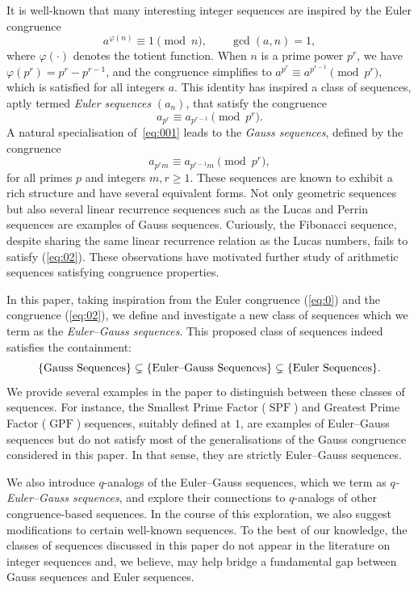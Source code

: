 \documentclass{article}
\numberwithin{equation}{section}
\theoremstyle{definition}
\begin{document}
It is well-known that many interesting integer sequences are inspired by the Euler congruence
\begin{equation}\label{eq:0}
a^{\varphi(n)} \equiv 1 \pmod{n}, \qquad \gcd(a,n)=1,
\end{equation}
where $\varphi(\cdot)$ denotes the totient function.  
When $n$ is a prime power $p^{r}$, we have $\varphi(p^{r}) = p^{r} - p^{r-1}$, and the congruence simplifies to
$
a^{p^{r}} \equiv a^{p^{r-1}} \pmod{p^{r}},
$
which is satisfied for all integers $a$.  
This identity has inspired a class of sequences, aptly termed \emph{Euler sequences} $(a_n)$, that satisfy the congruence
\begin{equation}\label{eq:001}
a_{p^{r}} \equiv a_{p^{r-1}} \pmod{p^{r}}.
\end{equation}
A natural specialisation of~\eqref{eq:001} leads to the \emph{Gauss sequences}, defined by the congruence
\begin{equation}\label{eq:02}
a_{p^{r}m} \equiv a_{p^{r-1}m} \pmod{p^{r}},
\end{equation}
for all primes $p$ and integers $m,r \ge 1$.  
These sequences are known to exhibit a rich structure and have several equivalent forms. Not only geometric sequences but also several linear recurrence sequences such as the Lucas and Perrin sequences are examples of Gauss sequences.
Curiously, the Fibonacci sequence, despite sharing the same linear recurrence relation as the Lucas numbers, fails to satisfy (\ref{eq:02}). These observations have motivated further study of arithmetic sequences satisfying congruence properties.

In this paper, taking inspiration from the Euler congruence (\ref{eq:0}) and the congruence (\ref{eq:02}), we define and investigate a new class of sequences which we term as the \emph{Euler--Gauss sequences}. This proposed class of sequences indeed satisfies the containment: 
$$
\{\textnormal{Gauss Sequences}\}  \subsetneq \{\textnormal{Euler--Gauss Sequences}\} \subsetneq \{\textnormal{Euler Sequences}\}.
$$
We provide several examples in the paper to distinguish between these classes of sequences. For instance, the Smallest Prime Factor ($\operatorname{SPF}$) and Greatest Prime Factor ($\operatorname{GPF}$) sequences, suitably defined at $1$, are examples of Euler--Gauss sequences but do not satisfy most of the generalisations of the Gauss congruence considered in this paper. In that sense, they are strictly Euler--Gauss sequences. 

We also introduce $q$-analogs of the Euler--Gauss sequences, which we term as \emph{$q$-Euler--Gauss sequences}, and explore their connections to $q$-analogs of other congruence-based sequences. In the course of this exploration, we also suggest modifications to certain well-known sequences. To the best of our knowledge, the classes of sequences discussed in this paper do not appear in the literature on integer sequences and, we believe, may help bridge a fundamental gap between Gauss sequences and Euler sequences. 
\end{document}
